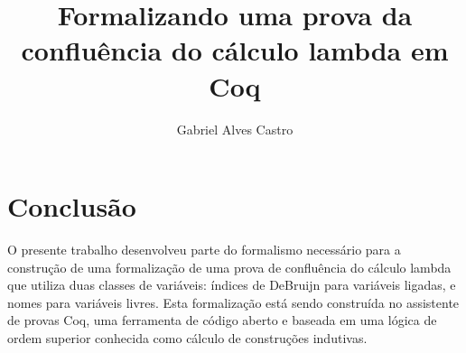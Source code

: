 \documentclass{article}
\title{Formalizando uma prova da confluência do cálculo lambda em Coq}
\author{Gabriel Alves Castro}
\date{}
\begin{document}
\maketitle





\section{Conclusão}

O presente trabalho desenvolveu parte do formalismo necessário para a construção de uma formalização de uma prova de confluência do cálculo lambda que utiliza duas classes de variáveis: índices de DeBruijn para variáveis ligadas, e nomes para variáveis livres. Esta formalização está sendo construída no assistente de provas Coq, uma ferramenta de código aberto e baseada em uma lógica de ordem superior conhecida como cálculo de construções indutivas.



\end{document}
